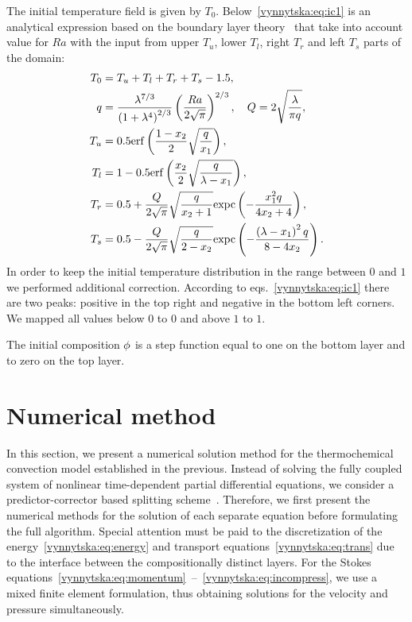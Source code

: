 The initial temperature field is given by $T_0$.
Below~\eqref{vynnytska:eq:ic1} is an analytical expression based on
the boundary layer theory~\citep{KekenEtAl1997} that take into account
value for $Ra$ with the input from upper $T_u$, lower $T_l$, right
$T_r$ and left $T_s$ parts of the domain:
\begin{subequations}
  \label{vynnytska:eq:ic1}
  \begin{align}
    T_0 &= T_u + T_l + T_r + T_s - 1.5, \\
    q &= \frac{\lambda^{7/3}}{\left(1 + \lambda^4 \right)^{2/3}} \left( \frac{Ra}{2 \sqrt{\pi}}\right)^{2/3}, \quad Q  = 2\sqrt{\frac{\lambda}{\pi q}},   \\
    T_u &= 0.5 \mathrm{erf} \left( \frac{1-x_2}{2} \sqrt{\frac{q}{x_1}  } \right), \\
    T_l &= 1 - 0.5 \mathrm{erf} \left( \frac{x_2}{2} \sqrt{\frac{q}{\lambda - x_1}  } \right), \\
    T_r &= 0.5 + \frac{Q}{2\sqrt{\pi}} \sqrt{\frac{q}{x_{2} + 1} } \mathrm{expc} \left( - \frac{x_1^2 q}{4 x_2 + 4} \right), \\
    T_s &= 0.5 - \frac{Q}{2\sqrt{\pi}} \sqrt{\frac{q}{2 - x_{2}} } \mathrm{expc} \left( - \frac{ \left(\lambda - x_1 \right)^2  q}{8 - 4 x_2} \right).
  \end{align}
\end{subequations}
In order to keep the initial temperature distribution in the range
between $0$ and $1$ we performed additional correction. According to
eqs.~\eqref{vynnytska:eq:ic1} there are two peaks: positive in the top
right and negative in the bottom left corners.  We mapped all values
below $0$ to $0$ and above $1$ to $1$.

The initial composition $\phi$ is a step function equal to one
on the bottom layer and to zero on the top layer.


\section{Numerical method}
In this section, we present a numerical solution method for the
thermochemical convection model established in the previous. Instead
of solving the fully coupled system of nonlinear time-dependent
partial differential equations, we consider a predictor-corrector
based splitting scheme~\citep{BergKekenYuen1993,
  HansenEbel1988}. Therefore, we first present the numerical methods
for the solution of each separate equation before formulating the full
algorithm. Special attention must be paid to the discretization of the
energy~\eqref{vynnytska:eq:energy} and transport
equations~\eqref{vynnytska:eq:trans} due to the interface between the
compositionally distinct layers. For the Stokes
equations~\eqref{vynnytska:eq:momentum}~--~\eqref{vynnytska:eq:incompress},
we use a mixed finite element formulation, thus obtaining solutions
for the velocity and pressure simultaneously.

